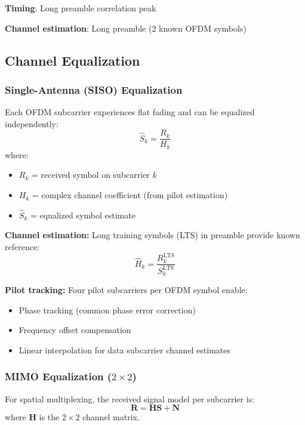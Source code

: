 \textbf{Timing}: Long preamble correlation peak

\textbf{Channel estimation}: Long preamble (2 known OFDM symbols)

\subsection{Channel Equalization}

\subsubsection*{Single-Antenna (SISO) Equalization}

Each OFDM subcarrier experiences flat fading and can be equalized independently:
\begin{equation}
\hat{S}_k = \frac{R_k}{H_k}
\end{equation}
where:
\begin{itemize}
\item $R_k$ = received symbol on subcarrier $k$
\item $H_k$ = complex channel coefficient (from pilot estimation)
\item $\hat{S}_k$ = equalized symbol estimate
\end{itemize}

\textbf{Channel estimation:} Long training symbols (LTS) in preamble provide known reference:
\begin{equation}
\hat{H}_k = \frac{R_k^{\text{LTS}}}{S_k^{\text{LTS}}}
\end{equation}

\textbf{Pilot tracking:} Four pilot subcarriers per OFDM symbol enable:
\begin{itemize}
\item Phase tracking (common phase error correction)
\item Frequency offset compensation
\item Linear interpolation for data subcarrier channel estimates
\end{itemize}

\subsubsection*{MIMO Equalization ($2 \times 2$)}

For spatial multiplexing, the received signal model per subcarrier is:
\begin{equation}
\mathbf{R} = \mathbf{H} \mathbf{S} + \mathbf{N}
\end{equation}
where $\mathbf{H}$ is the $2 \times 2$ channel matrix.


